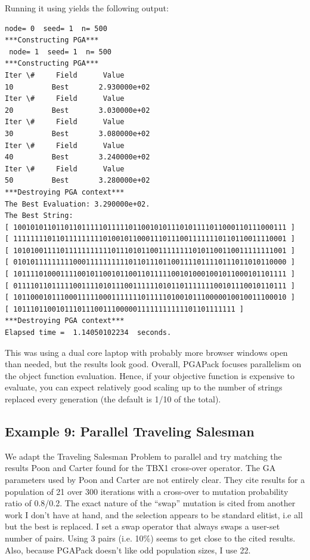 \documentclass[letterpaper,11pt,english]{sphinxmanual}
\begin{document}
Running it using  yields
the following output:

\begin{Verbatim}[commandchars=\\\{\}]
 node= 0  seed= 1  n= 500
***Constructing PGA***
 node= 1  seed= 1  n= 500
***Constructing PGA***
Iter \#     Field      Value
10         Best       2.930000e+02
Iter \#     Field      Value
20         Best       3.030000e+02
Iter \#     Field      Value
30         Best       3.080000e+02
Iter \#     Field      Value
40         Best       3.240000e+02
Iter \#     Field      Value
50         Best       3.280000e+02
***Destroying PGA context***
The Best Evaluation: 3.290000e+02.
The Best String:
[ 1001010110110110111110111110110010101110101111011000110111000111 ]
[ 1111111101101111111110100101100011101110011111110110110011110001 ]
[ 1010100111101111111111101110101100111111110101100110011111111001 ]
[ 0101011111111100011111111110110111011001111011110111011010110000 ]
[ 1011110100011110010110010110011011111001010001001011000101101111 ]
[ 0111101101111100111101011100111111010110111111100101110010110111 ]
[ 1011000101110001111100011111110111110100101110000010010011100010 ]
[ 1011101100101110111001110000011111111111101101111111 ]
***Destroying PGA context***
Elapsed time =  1.14050102234  seconds.
\end{Verbatim}

This was using a dual core laptop with probably more browser
windows open than needed, but the results look good.  Overall,
PGAPack focuses parallelism on the object function evaluation.
Hence, if your objective function is expensive to evaluate, you
can expect relatively good scaling up to the number of strings
replaced every generation (the default is 1/10 of the total).


\subsection{Example 9: Parallel Traveling Salesman}
\label{examples:example-9-parallel-traveling-salesman}
We adapt the Traveling Salesman Problem to parallel and try
matching the results Poon and Carter found for the TBX1
cross-over operator.  The GA
parameters used by Poon and Carter are not entirely clear.  They
cite results for a population of 21 over 300 iterations with a
cross-over to mutation probability ratio of 0.8/0.2.  The exact
nature of the ``swap'' mutation is cited from another work I don't have at
hand, and the selection appears to be standard elitist, i.e all but
the best is replaced.  I set a swap operator that always swaps
a user-set number of pairs.  Using 3 pairs (i.e. 10\%) seems
to get close to the cited results.  Also, because PGAPack doesn't like
odd population sizes, I use 22.
\end{document}
